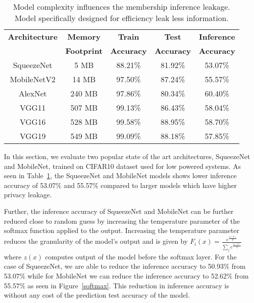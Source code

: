\begin{table}[!htb]
\begin{center}
\renewcommand\arraystretch{1.5}
\fontsize{6.7pt}{6.7pt}\selectfont
\begin{tabular}{|c|c|c|c|c|}
\hline
\textbf{Architecture} & \textbf{Memory} & \textbf{Train}  & \textbf{Test}  & \textbf{Inference}   \\
 & \textbf{Footprint} & \textbf{Accuracy} & \textbf{Accuracy} & \textbf{Accuracy}  \\
\hline
SqueezeNet & 5 MB & 88.21\% & 81.92\% & \cellcolor{green!25}53.07\% \\
MobileNetV2 & 14 MB & 97.50\% & 87.24\% & \cellcolor{green!25}55.57\% \\
\hline
AlexNet & 240 MB & 97.86\% & 80.34\% & \cellcolor{red!25}60.40\% \\
VGG11 & 507 MB & 99.13\% & 86.43\% & \cellcolor{red!25}58.04\% \\
VGG16 & 528 MB & 99.58\% & 88.95\% & \cellcolor{red!25}58.70\%  \\
VGG19 & 549 MB & 99.09\% & 88.18\% & \cellcolor{red!25}57.85\% \\
\hline
\end{tabular}
\end{center}
\caption{Model complexity influences the membership inference leakage. Model specifically designed for efficiency leak less information.}
\label{stdarch}
\end{table}

In this section, we evaluate two popular state of the art architectures, SqueezeNet and MobileNet, trained on CIFAR10 dataset used for low powered systems.
As seen in Table~\ref{stdarch}, the SqueezeNet and MobileNet models shows lower inference accuracy of 53.07\% and 55.57\% compared to larger models which have higher privacy leakage.



Further, the inference accuracy of SqueezeNet and MobileNet can be further reduced close to random guess by increasing the temperature parameter of the softmax function applied to the output.
Increasing the temperature parameter reduces the granularity of the model's output and is given by $F_i(x) = \frac{e^{\frac{z_i(x)}{T}}}{\sum_{j}e^{\frac{z_j(x)}{T}}}$ where $z(x)$ computes output of the model before the softmax layer.
For the case of SqueezeNet, we are able to reduce the inference accuracy to 50.93\% from 53.07\% while for MobileNet we can reduce the inference accuracy to 52.62\% from 55.57\% as seen in Figure~\ref{softmax}.
This reduction in inference accuracy is without any cost of the prediction test accuracy of the model.




